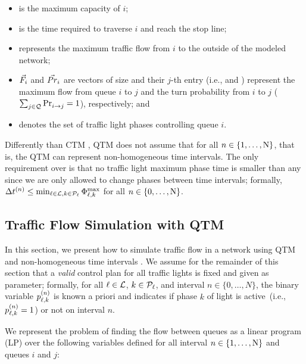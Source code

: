 \begin{itemize}
%
\item {} is the maximum capacity of $i$;
%
\item {} is the time required to traverse $i$ and reach the stop line;
%
\item {} represents the maximum traffic flow from $i$ to the outside of the
modeled network;
%
\item $\Fvec_i$ and $\Prvec_i$ are vectors of size \Qn and their $j$-th entry
  (i.e.,  and ) represent the maximum flow from queue $i$
  to $j$ and the turn probability from $i$ to $j$ ($\sum_{j \in
  \Qset}\FTURN{i}{j} = 1$), respectively; and
%
\item {} denotes the set of traffic light phases controlling
 queue $i$.
%
\end{itemize}


Differently than CTM \cite{daganzo1994cell,lin2004enhanced}, QTM does not assume
that  for all $n \in \{1,\dots,\Nn\}$, that is,
the QTM can represent non-homogeneous time intervals.
%
The only requirement over \DT[n] is that no traffic light maximum phase time is
smaller than any \DT[n] since we are only allowed to change phases between time
intervals; formally, $\DT[n] \le \min_{\tl \in \Lset, k \in \Pset_\tl}
\PTMAX{\tl}{k}$ for all $n \in \{0,\dots,\Nn\}$.






\subsection{Traffic Flow Simulation with QTM}

In this section, we present how to simulate traffic flow in a network using QTM
and non-homogeneous time intervals \DT[].
%
We assume for the remainder of this section that a \emph{valid} control plan for
all traffic lights is fixed and given as parameter;
%
formally, for all $\tl \in \Lset$, $k \in \Pset_\tl$, and interval $n \in
\{0,\dots,N\}$, the binary variable $\p{\tl}{k}$ is known a priori and indicates
if phase $k$ of light \tl is active~(i.e., $\p{\tl}{k} = 1$) or not on interval
$n$.


We represent the problem of finding the flow between queues as a linear program
(LP) over the following variables defined for all interval $n \in
\{1,\dots,\Nn\}$ and queues $i$ and $j$:

